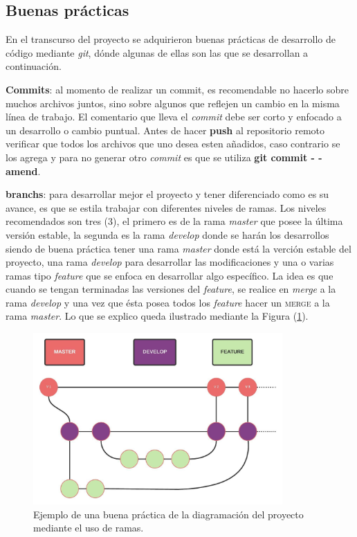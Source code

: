 \subsection{Buenas prácticas}

En el transcurso del proyecto se adquirieron buenas prácticas de desarrollo de código mediante \textit{git}, dónde algunas de ellas son las que se desarrollan a continuación.

\textbf{Commits}: al momento de realizar un commit, es recomendable no hacerlo sobre muchos archivos juntos, sino sobre algunos que reflejen un cambio en la misma línea de trabajo. El comentario que lleva el \textit{commit} debe ser corto y enfocado a un desarrollo o cambio puntual. Antes de hacer \textbf{push} al repositorio remoto verificar que todos los archivos que uno desea esten añadidos, caso contrario se los agrega y para no generar otro \textit{commit} es que se utiliza \textbf{git commit - -amend}.

\textbf{branchs}: para desarrollar mejor el proyecto y tener diferenciado como es su avance, es que se estila trabajar con diferentes niveles de ramas. Los niveles recomendados son tres (3), el primero es de la rama \textit{master} que posee la última versión estable, la segunda es la rama \textit{develop} donde se harán los desarrollos
 siendo de buena práctica tener una rama \textit{master} donde está la verción estable del proyecto, una rama \textit{develop} para desarrollar las modificaciones y una o varias ramas tipo \textit{feature} que se enfoca en desarrollar algo específico. La idea es que cuando se tengan terminadas las versiones del \textit{feature}, se realice en \textit{merge} a la rama \textit{develop} y una vez que ésta posea todos los \textit{feature} hacer un \textsc{merge} a la rama \textit{master}. Lo que se explico queda ilustrado mediante la Figura (\ref{fig:ramas}).
 
 \begin{figure}[htbp]
 	\centering
 	\includegraphics[width=0.85\textwidth]{figs/cap3/ejemplo_ramas}
 	\caption{Ejemplo de una buena práctica de la diagramación del proyecto mediante el uso de ramas.}
 	\label{fig:ramas}	
 \end{figure}
 
